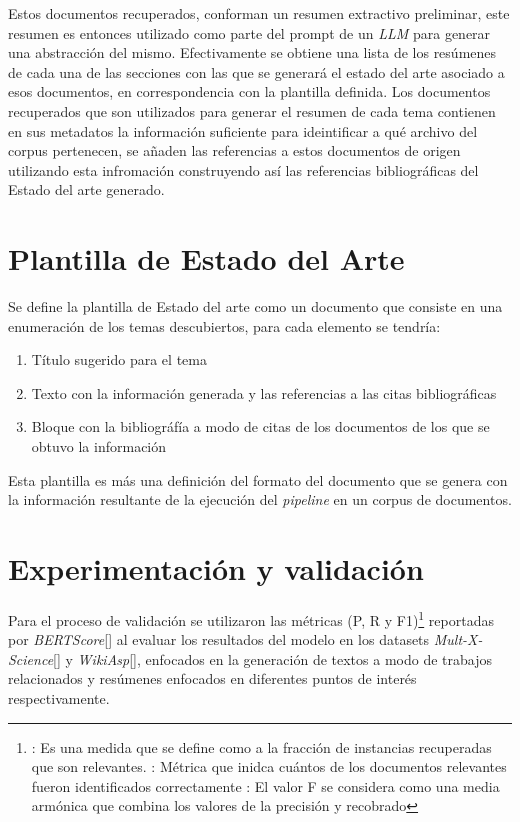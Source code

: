     Estos documentos recuperados, conforman un resumen extractivo preliminar, este resumen es entonces utilizado como parte del prompt de un \emph{LLM} para generar una abstracción del mismo. Efectivamente se obtiene una lista de los resúmenes de cada una de las secciones con las que se generará el estado del arte asociado a esos documentos, en correspondencia con la plantilla definida.
    Los documentos recuperados que son utilizados para generar el resumen de cada tema contienen en sus metadatos la información suficiente para ideintificar a qué archivo del corpus pertenecen, se añaden las referencias a estos documentos de origen utilizando esta infromación construyendo así las referencias bibliográficas del Estado del arte generado.


\section{Plantilla de Estado del Arte}
Se define la plantilla de Estado del arte como un documento que consiste en una enumeración de los temas descubiertos, 
para cada elemento se tendría:
\begin{enumerate}
    \item Título sugerido para el tema
    \item Texto con la información generada y las referencias a las citas bibliográficas
    \item Bloque con la bibliográfía a modo de citas de los documentos de los que se obtuvo la información
\end{enumerate}

Esta plantilla es más una definición del formato del documento que se genera con la información resultante de la ejecución del \emph{pipeline} en un corpus de documentos.

\section{Experimentación y validación}
Para el proceso de validación se utilizaron las m\'etricas (P, R y F1)\footnote{: Es una medida que se define como a la fracción de instancias recuperadas que son relevantes. : M\'etrica que inidca cu\'antos de los documentos relevantes fueron identificados correctamente : El valor F se considera como una media armónica que combina los valores de la precisión y recobrado} reportadas por \emph{BERTScore}[\cite{bertscore}] al evaluar los resultados del modelo en los datasets \emph{Mult-X-Science}[\cite{multixscience}] y \emph{WikiAsp}[\cite{wikiasp}], enfocados en la generación de textos a modo de trabajos relacionados y resúmenes enfocados en diferentes puntos de interés respectivamente.

